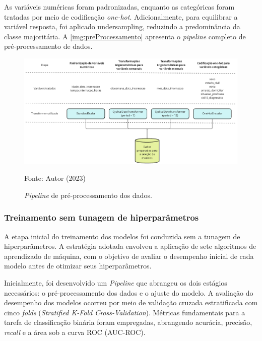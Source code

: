 As variáveis numéricas foram padronizadas, enquanto as categóricas foram tratadas por meio de codificação \textit{one-hot}. Adicionalmente, para equilibrar a variável resposta, foi aplicado undersampling, reduzindo a predominância da classe majoritária. A \autoref{img:preProcessamento} apresenta o \textit{pipeline} completo de pré-processamento de dados.

\begin{figure}[H]
	\centering
	\caption{\label{img:preProcessamento}\textit{Pipeline} de pré-processamento dos dados.}
	\includegraphics[scale=0.7]{USPSC-img/preprocessamento.pdf}
	\begin{center}
		Fonte: Autor (2023)
	\end{center}
\end{figure}

\subsubsection{Treinamento sem tunagem de hiperparâmetros}\label{sec:treinoSemHiperparametros}

A etapa inicial do treinamento dos modelos foi conduzida sem a tunagem de hiperparâmetros. A estratégia adotada envolveu a aplicação de sete algoritmos de aprendizado de máquina, com o objetivo de avaliar o desempenho inicial de cada modelo antes de otimizar seus hiperparâmetros.

Inicialmente, foi desenvolvido um \textit{Pipeline} que abrangeu os dois estágios necessários: o pré-processamento dos dados e o ajuste do modelo. A avaliação do desempenho dos modelos ocorreu por meio de validação cruzada estratificada com cinco \textit{folds} (\textit{Stratified K-Fold Cross-Validation}). Métricas fundamentais para a tarefa de classificação binária foram empregadas, abrangendo acurácia, precisão, \textit{recall} e a área sob a curva ROC (AUC-ROC).

